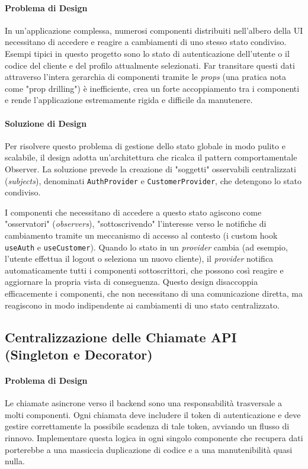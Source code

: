 \documentclass[12pt,a4paper,openright,twoside]{book}
\begin{document}
\paragraph{Problema di Design}
In un'applicazione complessa, numerosi componenti distribuiti nell'albero della UI necessitano di accedere e reagire a cambiamenti di uno stesso stato condiviso. Esempi tipici in questo progetto sono lo stato di autenticazione dell'utente o il codice del cliente e del profilo attualmente selezionati. Far transitare questi dati attraverso l'intera gerarchia di componenti tramite le \textit{props} (una pratica nota come "prop drilling") è inefficiente, crea un forte accoppiamento tra i componenti e rende l'applicazione estremamente rigida e difficile da manutenere.

\paragraph{Soluzione di Design}
Per risolvere questo problema di gestione dello stato globale in modo pulito e scalabile, il design adotta un'architettura che ricalca il pattern comportamentale Observer. La soluzione prevede la creazione di "soggetti" osservabili centralizzati (\textit{subjects}), denominati \texttt{AuthProvider} e \texttt{CustomerProvider}, che detengono lo stato condiviso.

I componenti che necessitano di accedere a questo stato agiscono come "osservatori" (\textit{observers}), "sottoscrivendo" l'interesse verso le notifiche di cambiamento tramite un meccanismo di accesso al contesto (i custom hook \texttt{useAuth} e \texttt{useCustomer}). Quando lo stato in un \textit{provider} cambia (ad esempio, l'utente effettua il logout o seleziona un nuovo cliente), il \textit{provider} notifica automaticamente tutti i componenti sottoscrittori, che possono così reagire e aggiornare la propria vista di conseguenza. Questo design disaccoppia efficacemente i componenti, che non necessitano di una comunicazione diretta, ma reagiscono in modo indipendente ai cambiamenti di uno stato centralizzato.

\subsection{Centralizzazione delle Chiamate API (Singleton e Decorator)}
\label{subsec:design_api_singleton_decorator}

\paragraph{Problema di Design}
Le chiamate asincrone verso il backend sono una responsabilità trasversale a molti componenti. Ogni chiamata deve includere il token di autenticazione e deve gestire correttamente la possibile scadenza di tale token, avviando un flusso di rinnovo. Implementare questa logica in ogni singolo componente che recupera dati porterebbe a una massiccia duplicazione di codice e a una manutenibilità quasi nulla.
\end{document}
